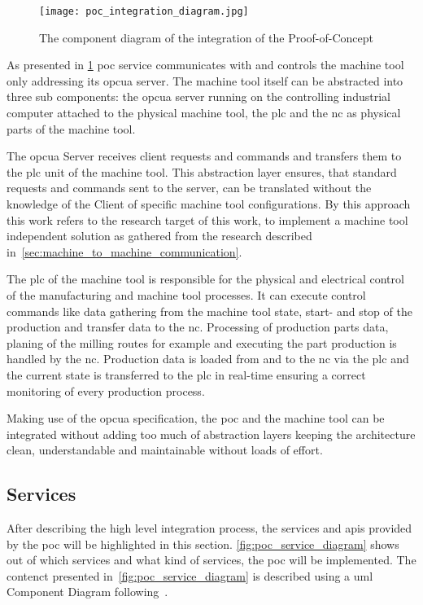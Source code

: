 \documentclass[
a4paper,
twoside,
headsepline,
cleardoublepage=empty,
parskip=half,
draft=false
]{scrbook}
\begin{document}
				\begin{figure}[H]
					\centering
					\texttt{[image: poc\_integration\_diagram.jpg]}
					\caption{The component diagram of the integration of the Proof-of-Concept}
					\label{fig:poc_integration_diagram}
				\end{figure}

				As presented in \cref{fig:poc_integration_diagram} \gls{poc} service communicates with and controls the machine tool only addressing its \gls{opcua} server. The machine tool itself can be abstracted into three sub components: the \gls{opcua} server running on the controlling industrial computer attached to the physical machine tool, the \gls{plc} and the \gls{nc} as physical parts of the machine tool.

				The \gls{opcua} Server receives client requests and commands and transfers them to the \gls{plc} unit of the machine tool. This abstraction layer ensures, that standard requests and commands sent to the server, can be translated without the knowledge of the Client of specific machine tool configurations.
				By this approach this work refers to the research target of this work, to implement a machine tool independent solution as gathered from the research described in~\cref{sec:machine_to_machine_communication}.

				The \gls{plc} of the machine tool is responsible for the physical and electrical control of the manufacturing and machine tool processes. It can execute control commands like data gathering from the machine tool state, start- and stop of the production and transfer data to the \gls{nc}. Processing of production parts data, planing of the milling routes for example and executing the part production is handled by the \gls{nc}. Production data is loaded from and to the \gls{nc} via the \gls{plc} and the current state is transferred to the \gls{plc} in real-time ensuring a correct monitoring of every production process.

				Making use of the \gls{opcua} specification, the \gls{poc} and the machine tool can be integrated without adding too much of abstraction layers keeping the architecture clean, understandable and maintainable without loads of effort.

			\subsection{Services} \label{subsec:services}

				After describing the high level integration process, the services and \gls{api}s provided by the \gls{poc} will be highlighted in this section. \cref{fig:poc_service_diagram} shows out of which services and what kind of services, the \gls{poc} will be implemented. The contenct presented in~\cref{fig:poc_service_diagram} is described using a \gls{uml} Component Diagram following~\cite{uml2017}.
				
\end{document}
